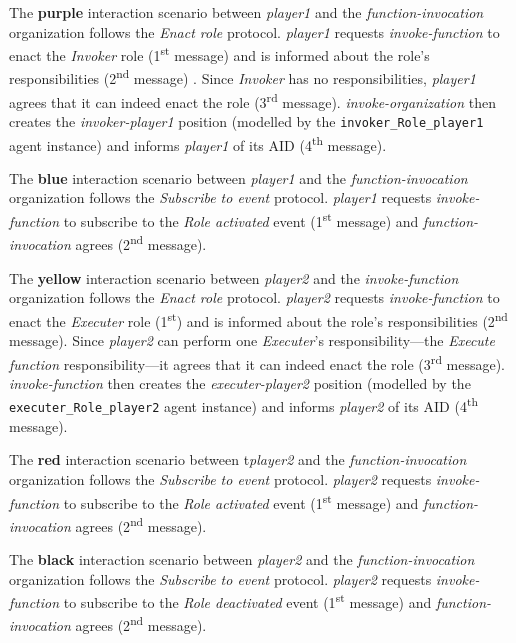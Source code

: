 The \textbf{purple} interaction scenario between \textit{player1} and the \textit{function-invocation} organization follows the \textit{Enact role} protocol.
\textit{player1} requests \textit{invoke-function} to enact the \textit{Invoker} role (1\textsuperscript{st} message) and is informed about the role's responsibilities (2\textsuperscript{nd} message) .
Since \textit{Invoker} has no responsibilities, \textit{player1} agrees that it can indeed enact the role (3\textsuperscript{rd} message).
\textit{invoke-organization} then creates the \textit{invoker-player1} position (modelled by the \texttt{invoker\_Role\_player1} agent instance) and informs \textit{player1} of its AID (4\textsuperscript{th} message).

The \textbf{blue} interaction scenario between \textit{player1} and the \textit{function-invocation} organization follows the \textit{Subscribe to event} protocol.
\textit{player1} requests \textit{invoke-function} to subscribe to the \textit{Role activated} event (1\textsuperscript{st} message) and \textit{function-invocation} agrees (2\textsuperscript{nd} message).

The \textbf{yellow} interaction scenario between \textit{player2} and the \textit{invoke-function} organization follows the \textit{Enact role} protocol.
\textit{player2} requests \textit{invoke-function} to enact the \textit{Executer} role (1\textsuperscript{st}) and is informed about the role's responsibilities (2\textsuperscript{nd} message).
Since \textit{player2} can perform one \textit{Executer}'s responsibility---the \textit{Execute function} responsibility---it agrees that it can indeed enact the role (3\textsuperscript{rd} message).
\textit{invoke-function} then creates the \textit{executer-player2} position (modelled by the \texttt{executer\_Role\_player2} agent instance) and informs \textit{player2} of its AID (4\textsuperscript{th} message).

The \textbf{red} interaction scenario between t\textit{player2} and the \textit{function-invocation} organization follows the \textit{Subscribe to event} protocol.
\textit{player2} requests \textit{invoke-function} to subscribe to the \textit{Role activated} event (1\textsuperscript{st} message) and \textit{function-invocation} agrees (2\textsuperscript{nd} message).

The \textbf{black} interaction scenario between \textit{player2} and the \textit{function-invocation} organization follows the \textit{Subscribe to event} protocol.
\textit{player2} requests \textit{invoke-function} to subscribe to the \textit{Role deactivated} event (1\textsuperscript{st} message) and \textit{function-invocation} agrees (2\textsuperscript{nd} message).

